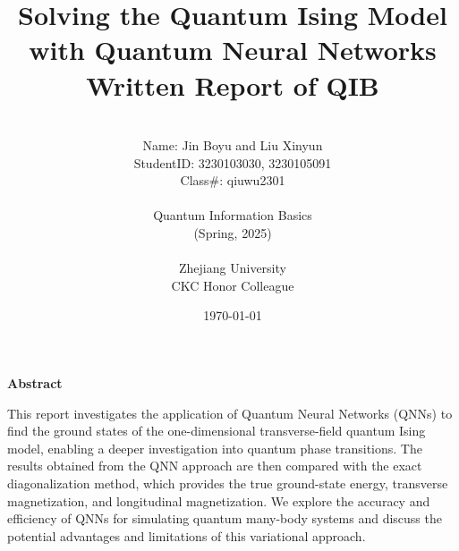 \documentclass[a4paper]{article}
\begin{document}
\title{{\Huge Solving the Quantum Ising Model with Quantum Neural Networks {\large\linebreak\\}}{\Large Written Report of QIB\linebreak\linebreak}}
\author{\\Name: Jin Boyu and Liu Xinyun\\
StudentID: 3230103030, 3230105091  \\
Class\#: qiuwu2301\\\\
Quantum Information Basics\\
(Spring, 2025)\\\\
Zhejiang University\\
CKC Honor Colleague}
\date{\today}
\maketitle
\newpage

\begin{center}
{\large\bf{Abstract\\}}
\end{center}
This report investigates the application of Quantum Neural Networks (QNNs) to find the ground states of the one-dimensional transverse-field quantum Ising model, enabling a deeper investigation into quantum phase transitions. The results obtained from the QNN approach are then compared with the exact diagonalization method, which provides the true ground-state energy, transverse magnetization, and longitudinal magnetization. We explore the accuracy and efficiency of QNNs for simulating quantum many-body systems and discuss the potential advantages and limitations of this variational approach.
\newpage
\tableofcontents\label{c}
\newpage


\end{document}

